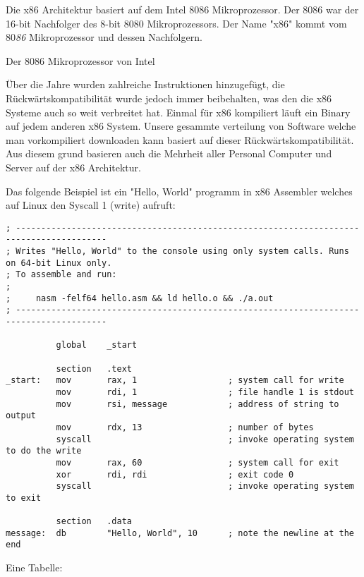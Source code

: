Die x86 Architektur basiert auf dem Intel 8086 Mikroprozessor. \cite{Wikipediax86}
Der 8086 war der 16-bit Nachfolger des 8-bit 8080 Mikroprozessors.
Der Name "x86" kommt vom 80{\it 86} Mikroprozessor und dessen Nachfolgern.

    {Der 8086 Mikroprozessor von Intel}

Über die Jahre wurden zahlreiche Instruktionen hinzugefügt, die
Rückwärtskompatibilität wurde jedoch immer beibehalten, was den die x86
Systeme auch so weit verbreitet hat. Einmal für x86 kompiliert läuft ein
Binary auf jedem anderen x86 System. Unsere gesammte verteilung von
Software welche man vorkompiliert downloaden kann basiert auf dieser
Rückwärtskompatibilität. Aus diesem grund basieren auch die Mehrheit aller
Personal Computer und Server auf der x86 Architektur.



Das folgende Beispiel ist ein "Hello, World" programm in x86 Assembler
welches auf Linux den Syscall 1 (write) aufruft:

\begin{verbatim}
; ----------------------------------------------------------------------------------------
; Writes "Hello, World" to the console using only system calls. Runs on 64-bit Linux only.
; To assemble and run:
;
;     nasm -felf64 hello.asm && ld hello.o && ./a.out
; ----------------------------------------------------------------------------------------

          global    _start

          section   .text
_start:   mov       rax, 1                  ; system call for write
          mov       rdi, 1                  ; file handle 1 is stdout
          mov       rsi, message            ; address of string to output
          mov       rdx, 13                 ; number of bytes
          syscall                           ; invoke operating system to do the write
          mov       rax, 60                 ; system call for exit
          xor       rdi, rdi                ; exit code 0
          syscall                           ; invoke operating system to exit

          section   .data
message:  db        "Hello, World", 10      ; note the newline at the end
\end{verbatim}


Eine Tabelle:

